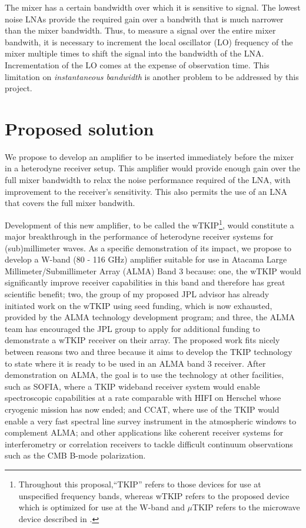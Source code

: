 The mixer has a certain bandwidth over which it is sensitive to signal. The lowest noise LNAs provide the required gain over a bandwith that is much narrower than the mixer bandwidth. Thus, to measure a signal over the entire mixer bandwith, it is necessary to increment the local oscillator (LO) frequency of the mixer multiple times to shift the signal into the bandwidth of the LNA. Incrementation of the LO comes at the expense of observation time. This limitation on \emph{instantaneous bandwidth} is another problem to be addressed by this project. 

\section{Proposed solution}
We propose to develop an amplifier to be inserted immediately before the mixer in a heterodyne receiver setup. This amplifier would provide enough gain over the full mixer bandwidth to relax the noise performance required of the LNA, with improvement to the receiver's sensitivity. This also permits the use of an LNA that covers the full mixer bandwith.
   
Development of this new amplifier, to be called the wTKIP\footnote{Throughout this proposal,``TKIP'' refers to those devices for use at unspecified frequency bands, whereas wTKIP refers to the proposed device which is optimized for use at the W-band and $\mu$TKIP refers to the microwave device described in \cite{Eom2012} \label{foot:TKIP}.}, would constitute a major breakthrough in the performance of heterodyne receiver systems for (sub)millimeter waves. As a specific demonstration of its impact, we propose to develop a W-band  (80 - 116 GHz) amplifier suitable for use in Atacama Large Millimeter/Submillimeter Array (ALMA) Band 3 because: one, the wTKIP would significantly improve receiver capabilities in this band and therefore has great scientific benefit; two, the group of my proposed JPL advisor has already initiated work on the wTKIP using seed funding, which is now exhausted, provided by the ALMA technology development program; and three, the ALMA team has encouraged the JPL group to apply for additional funding to demonstrate a wTKIP receiver on their array. The proposed work fits nicely between reasons two and three because it aims to develop the TKIP technology to  state where it is ready to be used in an ALMA band 3 receiver. After demonstration on ALMA, the goal is to use the technology at other facilities, such as SOFIA, where a TKIP wideband receiver system would enable spectroscopic capabilities at a rate comparable with HIFI on Herschel whose cryogenic mission has now ended; and CCAT, where use of the TKIP would enable a very fast spectral line survey instrument in the atmospheric windows to complement ALMA; and other applications like coherent receiver systems for interferometry or correlation receivers to tackle difficult continuum observations such as the CMB B-mode polarization.


